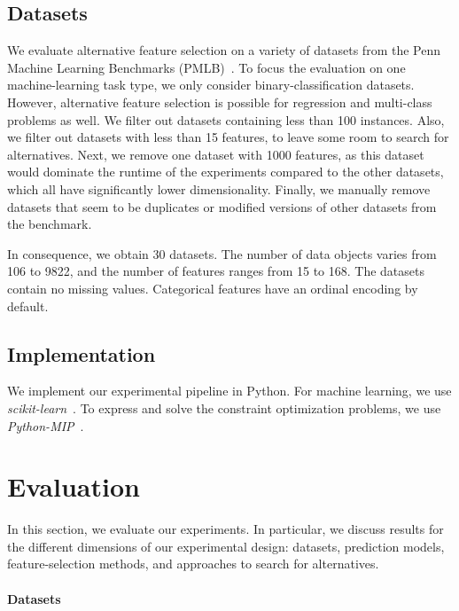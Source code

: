 \documentclass{article}
\theoremstyle{definition}
\begin{document}
\subsection{Datasets}
\label{sec:experimental-design:datasets}

We evaluate alternative feature selection on a variety of datasets from the Penn Machine Learning Benchmarks (PMLB)~\cite{olson2017pmlb,romano2021pmlb}.
To focus the evaluation on one machine-learning task type, we only consider binary-classification datasets.
However, alternative feature selection is possible for regression and multi-class problems as well.
We filter out datasets containing less than 100 instances.
Also, we filter out datasets with less than 15 features, to leave some room to search for alternatives.
Next, we remove one dataset with 1000 features, as this dataset would dominate the runtime of the experiments compared to the other datasets, which all have significantly lower dimensionality.
Finally, we manually remove datasets that seem to be duplicates or modified versions of other datasets from the benchmark.

In consequence, we obtain 30 datasets.
The number of data objects varies from 106 to 9822, and the number of features ranges from 15 to 168.
The datasets contain no missing values.
Categorical features have an ordinal encoding by default.

\subsection{Implementation}
\label{sec:experimental-design:implementation}

We implement our experimental pipeline in Python.
For machine learning, we use \emph{scikit-learn}~\cite{pedregosa2011scikit-learn}.
To express and solve the constraint optimization problems, we use \emph{Python-MIP}~\cite{python-mip}.

\section{Evaluation}
\label{sec:evaluation}

In this section, we evaluate our experiments.
In particular, we discuss results for the different dimensions of our experimental design:
datasets, prediction models, feature-selection methods, and approaches to search for alternatives.

\paragraph{Datasets}
\end{document}
